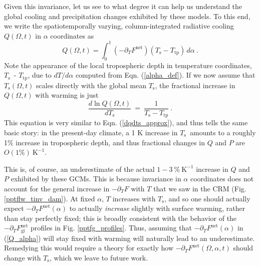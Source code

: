 \documentclass[10pt]{article}
\newcommand{\beqn}{\begin{equation}}
\newcommand{\eeqn}{\end{equation}}
\newcommand{\eqnref}[1]{(\ref{#1})}
\newcommand{\n}{\nonumber}
\newcommand{\ppt}{\ensuremath{\partial_T}}
\newcommand{\Fnet}{\ensuremath{F^\mathrm{net}}}
\newcommand{\Fnetgl}{\ensuremath{F^\mathrm{net}_{\mathrm{gl}}}}
\newcommand{\Ts}{\ensuremath{T_\mathrm{s}}}
\newcommand{\Ttp}{\ensuremath{T_\mathrm{tp}}}
\newcommand{\Kinverse}{\ensuremath{\mathrm{K^{-1}}}}
\begin{document}
Given this invariance, let us see to what degree it can help us understand the global cooling and precipitation changes exhibited by these models. To this end, we write the spatiotemporally varying, column-integrated radiative cooling $Q(\Omega,t)$ in $\alpha$ coordinates as 
	\beqn
		Q(\Omega,t)   =  \int_0^{1} (- \partial_{T} \Fnet) (\Ts - \Ttp)\, d\alpha  \ .
		\label{Q_alpha}
	\eeqn
Note the appearance of the local tropospheric depth in temperature coordinates, \Ts\ - \Ttp,  due to $dT/d\alpha$ computed from Eqn. \eqnref{alpha_def}. If we now assume that $\Ts(\Omega,t)$ scales directly with the global mean \Ts, the fractional increase in $Q(\Omega,t)$ with  warming is just 
\beqn
		\frac{d \ln Q(\Omega,t)}{d \Ts}  \ =\   \frac{1}{\Ts-\Ttp}\ . 
		\label{dqdts_gcm}
\eeqn
This equation is very similar to Eqn. \eqnref{dqdts_approx}, and thus  tells the  same basic story: in the present-day climate, a 1 K increase in \Ts\ amounts to a roughly 1\% increase in tropospheric depth,  and thus fractional changes in  $Q$ and $P$ are $O(1\%)\ \Kinverse$. 

This is, of course, an underestimate of the actual $1-3 \ \% \ \Kinverse$ increase in $Q$ and $P$ exhibited by these GCMs. This is because invariance in $\alpha$ coordinates does not account for  the general increase in $-\ppt F$ with $T$ that we saw in the CRM (Fig. \ref{pptflw_tinv_dam}). At fixed $\alpha$, $T$ increases with \Ts, and so one should actually expect $-\ppt\Fnet(\alpha)$ to actually \emph{increase} slightly with surface warming, rather than stay perfectly fixed; this is broadly consistent with the behavior of the $-\ppt \Fnetgl$ profiles in Fig. \ref{pptfg_profiles}.  Thus, assuming that $-\ppt \Fnet(\alpha)$ in \eqnref{Q_alpha} will stay fixed with warming will naturally lead to an underestimate. Remedying this would require a  theory for exactly how $-\ppt \Fnet(\Omega,\alpha,t)$ should change with \Ts, which we leave to future work.	

\end{document}
